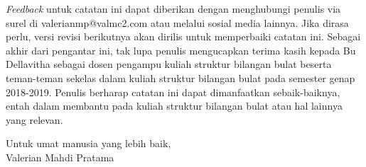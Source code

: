 	\textit{Feedback} untuk catatan ini dapat diberikan dengan menghubungi penulis via surel di valerianmp@valmc2.com atau melalui sosial media lainnya. Jika dirasa perlu, versi revisi berikutnya akan dirilis untuk memperbaiki catatan ini. Sebagai akhir dari pengantar ini, tak lupa penulis mengucapkan terima kasih kepada Bu Dellavitha sebagai dosen pengampu kuliah struktur bilangan bulat beserta teman-teman sekelas dalam kuliah struktur bilangan bulat pada semester genap 2018-2019. Penulis berharap catatan ini dapat dimanfaatkan sebaik-baiknya, entah dalam membantu pada kuliah struktur bilangan bulat atau hal lainnya yang relevan.
	\\
	\begin{flushright}	
	Untuk umat manusia yang lebih baik,\\
	\hfill \break
	Valerian Mahdi Pratama
	\end{flushright}
	